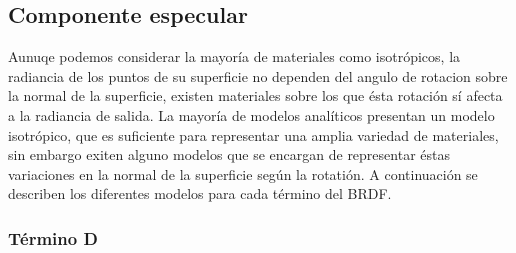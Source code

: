     \subsection{Componente especular}
    Aunuqe podemos considerar la mayor\'ia de materiales como isotr\'opicos, la radiancia de los puntos de su superficie no dependen
    del angulo de rotacion sobre la normal de la superficie, existen materiales sobre los que \'esta rotaci\'on s\'i afecta
    a la radiancia de salida. La mayor\'ia de modelos anal\'iticos presentan un modelo isotr\'opico, que es suficiente para
    representar una amplia variedad de materiales, sin embargo exiten alguno modelos que se encargan de representar \'estas
    variaciones en la normal de la superficie seg\'un la rotati\'on. A continuaci\'on se describen los diferentes modelos
    para cada t\'ermino del BRDF.


        \subsubsection*{T\'ermino D}

